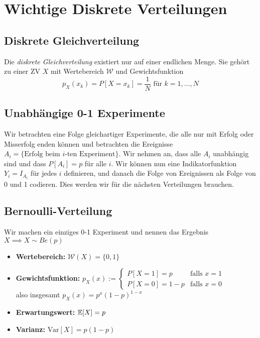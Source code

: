 \section{Wichtige Diskrete Verteilungen}

\subsection{Diskrete Gleichverteilung}
Die \textit{diskrete Gleichverteilung} existiert nur auf einer endlichen Menge. Sie gehört zu einer ZV $X$ mit Wertebereich $\mathcal{W}$ und Gewichtsfunktion 
$$p_X(x_k) = P[X=x_k]=\frac{1}{N} \mbox{   für } k=1,\dots, N$$

\subsection{Unabhängige 0-1 Experimente}
Wir betrachten eine Folge gleichartiger Experimente, die alle nur mit Erfolg oder Misserfolg enden können und betrachten die Ereignisse $A_i = \{\mbox{Erfolg beim }i\mbox{-ten Experiment}\}$. Wir nehmen an, dass alle $A_i$ unabhängig sind und dass $P[A_i]=p$ für alle $i$. Wir können nun eine Indikatorfunktion $Y_i = I_{A_i}$ für jedes $i$ definieren, und danach die Folge von Ereignissen als Folge von 0 und 1 codieren. Dies werden wir für die nächsten Verteilungen brauchen.

\subsection{Bernoulli-Verteilung}
Wir machen ein einziges 0-1 Experiment und nennen das Ergebnis $X \implies X \sim Be(p)$ 
\begin{itemize}
\item \textbf{Wertebereich:} $\mathcal{W}(X) = \{0,1\}$
\item \textbf{Gewichtsfunktion:} $p_X(x) := \begin{cases} P[X=1]=p & \mbox{falls } x=1 \\ P[X=0]=1-p & \mbox{falls } x=0 \end{cases}\quad \quad \quad$\\also insgesamt $p_X(x)= p^x(1-p)^{1-x}$
\item \textbf{Erwartungswert:} $\mathbb{E}[X]=p \quad \quad \quad$
\item \textbf{Varianz:} $\mbox{Var}[X] = p(1-p)$
\end{itemize}

